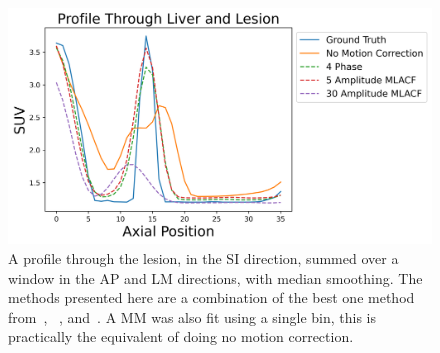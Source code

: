             \begin{figure}
                \centering
                
                \includegraphics[width=1.0\linewidth]{figures/motion_correction_2_results_2_best_profile.png}
                
                \captionsetup{singlelinecheck=false}
                \caption{
                    A profile through the lesion, in the \gls{SI} direction, summed over a window in the \gls{AP} and \gls{LM} directions, with median smoothing. The methods presented here are a combination of the best one method from~, ~, and~. A \gls{MM} was also fit using a single bin, this is practically the equivalent of doing no motion correction.
                }
                
                \label{fig:evaluation_of_pet_ct_motion_correction_incorporating_motion_models_using_mlacf_and_complex_gating_schemes_results_best_profile}
            \end{figure}
            
